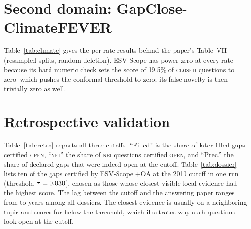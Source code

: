 \documentclass[10pt,a4paper]{article}
\theoremstyle{definition}
\theoremstyle{remark}
\newcommand{\open}{\textup{\textsc{open}}}
\newcommand{\closed}{\textup{\textsc{closed}}}
\begin{document}
\begin{table}[h]
\centering
\caption{Largest mean false novelty over all deletion rates. Res.: resampled splits; T$\to$T: calibrate on the training split, evaluate on the test split.}
\label{tab:robust}

\end{table}

\section{Second domain: GapClose-ClimateFEVER}\label{sec:climate}

Table~\ref{tab:climate} gives the per-rate results behind the paper's Table~VII (resampled splits, random deletion). ESV-Scope has power zero at every rate because its hard numeric check sets the score of 19.5\% of \closed{} questions to zero, which pushes the conformal threshold to zero; its false novelty is then trivially zero as well.

\begin{table}[h]
\centering
\caption{GapClose-ClimateFEVER, resampled splits, random deletion, by deletion rate.}
\label{tab:climate}

\end{table}

\clearpage
\section{Retrospective validation}\label{sec:retro}

Table~\ref{tab:retro} reports all three cutoffs. ``Filled'' is the share of later-filled gaps certified \open{}, ``\textsc{nei}'' the share of \textsc{nei} questions certified \open{}, and ``Prec.'' the share of declared gaps that were indeed open at the cutoff. Table~\ref{tab:dossier} lists ten of the \SuppNdos{} gaps certified by ESV-Scope +OA at the 2010 cutoff in one run (threshold $\tau=0.030{}$), chosen as those whose closest visible local evidence had the highest score. The lag between the cutoff and the answering paper ranges from \SuppLagMin{} to \SuppLagMax{} years among all \SuppNdos{} dossiers. The closest evidence is usually on a neighboring topic and scores far below the threshold, which illustrates why such questions look open at the cutoff.

\begin{table}[h]
\centering
\caption{Retrospective certification at three cutoffs, in-situ calibration, mean over \SuppR{} splits.}
\label{tab:retro}

\end{table}
\end{document}
